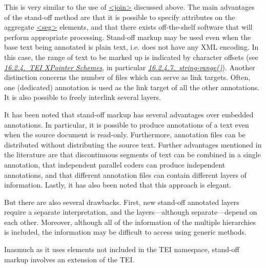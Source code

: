 This is very similar to the use of \hyperref[TEI.join]{<join>} discussed above. The main advantages of the stand-off method are that it is possible to specify attributes on the aggregate \hyperref[TEI.seg]{<seg>} elements, and that there exists off-the-shelf software that will perform appropriate processing. Stand-off markup may be used even when the base text being annotated is plain text, i.e. does not have any XML encoding. In this case, the range of text to be marked up is indicated by character offsets (see \textit{\hyperref[SATS]{16.2.4.\ TEI XPointer Schemes}}, in particular \textit{\hyperref[SATSSR]{16.2.4.7.\ string-range()}}). Another distinction concerns the number of files which can serve as link targets. Often, one (dedicated) annotation is used as the link target of all the other annotations. It is also possible to freely interlink several layers.\par
It has been noted that stand-off markup has several advantages over embedded annotations. In particular, it is possible to produce annotations of a text even when the source document is read-only. Furthermore, annotation files can be distributed without distributing the source text. Further advantages mentioned in the literature are that discontinuous segments of text can be combined in a single annotation, that independent parallel coders can produce independent annotations, and that different annotation files can contain different layers of information. Lastly, it has also been noted that this approach is elegant.\par
But there are also several drawbacks. First, new stand-off annotated layers require a separate interpretation, and the layers—although separate—depend on each other. Moreover, although all of the information of the multiple hierarchies is included, the information may be difficult to access using generic methods.\par
Inasmuch as it uses elements not included in the TEI namespace, stand-off markup involves an extension of the TEI.
